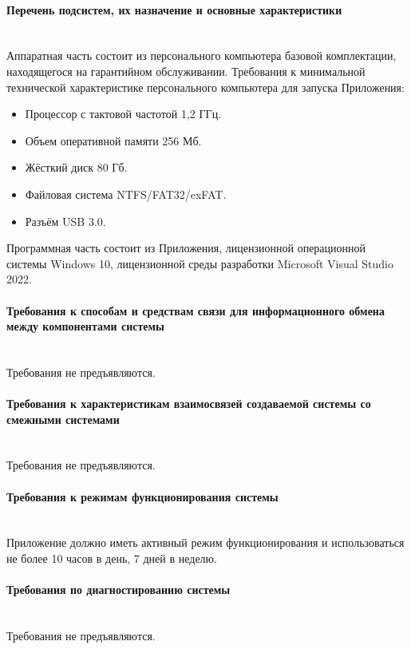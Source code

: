 \documentclass[12pt,a4paper]{article}
\begin{document}
\paragraph{Перечень подсистем, их назначение и основные характеристики} \label{system}\mbox{}\medskip\\
\noindent Аппаратная часть состоит из персонального компьютера базовой комплектации, находящегося на гарантийном 
обслуживании. Требования к минимальной технической характеристике персонального компьютера для запуска Приложения:
\begin{itemize}
    \item Процессор с тактовой частотой 1,2 ГГц.
    \item Объем оперативной памяти 256 Мб.
    \item Жёсткий диск 80 Гб.
    \item Файловая система NTFS/FAT32/exFAT.
    \item Разъём USB 3.0.
\end{itemize}

\noindent Программная часть состоит из Приложения, лицензионной операционной системы \linebreak Windows 10, 
лицензионной среды разработки Microsoft Visual Studio 2022.

\paragraph{Требования к способам и средствам связи для информационного обмена между компонентами системы} \mbox{}\medskip\\
Требования не предъявляются.

\paragraph{Требования к характеристикам взаимосвязей создаваемой системы со смежными системами} \mbox{}\medskip\\
Требования не предъявляются.

\paragraph{Требования к режимам функционирования системы}\mbox{}\medskip\\
Приложение должно иметь активный режим функционирования и использоваться не более 10 часов в день, 7 дней в неделю.

\paragraph{Требования по диагностированию системы}\mbox{}\medskip\\
Требования не предъявляются.
\end{document}
